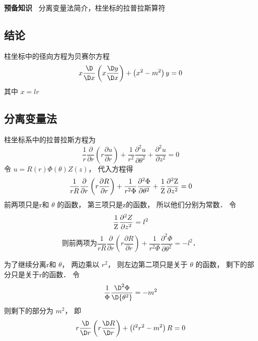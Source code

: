 
\begin{mdframed} \textbf{预备知识\ } 分离变量法简介，柱坐标的拉普拉斯算符
 \end{mdframed} 

\subsection{结论}

柱坐标中的径向方程为贝赛尔方程
 \begin{equation}
x\frac{\D}{{\D x}}\left( {x\frac{{\D y}}{{\D x}}} \right) + \left( {{x^2} - {m^2}} \right)y = 0
\end{equation}
其中 $x = lr$ 

\subsection{分离变量法}
柱坐标系中的拉普拉斯方程为
\begin{equation}
\frac{1}{r}\frac{\partial }{{\partial r}}\left( {r\frac{{\partial u}}{{\partial r}}} \right) + \frac{1}{{{r^2}}}\frac{{{\partial ^2}u}}{{\partial {\theta ^2}}} + \frac{{{\partial ^2}u}}{{\partial {z^2}}} = 0
\end{equation}
令 $u = R\left( r \right)\Phi \left( \theta  \right)Z\left( z \right)$，   代入方程得
\begin{equation}
\frac{1}{{rR}}\frac{\partial }{{\partial r}}\left( {r\frac{{\partial R}}{{\partial r}}} \right) + \frac{1}{{{r^2}\Phi }}\frac{{{\partial ^2}\Phi }}{{\partial {\theta ^2}}} + \frac{1}{{\rm Z}}\frac{{{\partial ^2}{\rm Z}}}{{\partial {z^2}}} = 0
\end{equation}
前两项只是r和 $\theta $ 的函数， 第三项只是z的函数， 所以他们分别为常数． 令
\begin{equation}\label{CylLap_4}
\frac{1}{{\rm Z}}\frac{{{\partial ^2}Z}}{{\partial {z^2}}} = {l^2}
\end{equation}
\begin{equation}
\text{ 则前两项为} \frac{1}{{rR}}\frac{\partial }{{\partial r}}\left( {r\frac{{\partial R}}{{\partial r}}} \right) + \frac{1}{{{r^2}\Phi }}\frac{{{\partial ^2}\Phi }}{{\partial {\theta ^2}}} =  - {l^2} \text{． } 
\end{equation}

为了继续分离r和 $\theta $，   两边乘以 ${r^2}$，   则左边第二项只是关于 $\theta $  的函数， 剩下的部分只是关于r的函数． 令
\begin{equation}\label{CylLap_6}
\frac{1}{\Phi }\frac{{{\D ^2}\Phi }}{{\D {\theta ^2}}} =  - {m^2}
\end{equation}
则剩下的部分为 ${m^2}$，   即
  \begin{equation}\label{CylLap_7}
r\frac{\D }{{\D r}}\left( {r\frac{{\D R}}{{\D r}}} \right) + \left( {{l^2}{r^2} - {m^2}} \right)R = 0
\end{equation}

